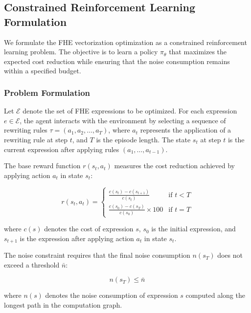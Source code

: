 \subsection{Constrained Reinforcement Learning Formulation}

We formulate the FHE vectorization optimization as a constrained reinforcement learning problem. The objective is to learn a policy $\pi_\theta$ that maximizes the expected cost reduction while ensuring that the noise consumption remains within a specified budget.

\subsubsection{Problem Formulation}

Let $\mathcal{E}$ denote the set of FHE expressions to be optimized. For each expression $e \in \mathcal{E}$, the agent interacts with the environment by selecting a sequence of rewriting rules $\tau = (a_1, a_2, \ldots, a_T)$, where $a_t$ represents the application of a rewriting rule at step $t$, and $T$ is the episode length. The state $s_t$ at step $t$ is the current expression after applying rules $(a_1, \ldots, a_{t-1})$.

The base reward function $r(s_t, a_t)$ measures the cost reduction achieved by applying action $a_t$ in state $s_t$:

\begin{equation}
r(s_t, a_t) = \begin{cases}
\frac{c(s_t) - c(s_{t+1})}{c(s_t)} & \text{if } t < T \\
\frac{c(s_0) - c(s_T)}{c(s_0)} \times 100 & \text{if } t = T
\end{cases}
\label{eq:base-reward}
\tag{7}
\end{equation}

where $c(s)$ denotes the cost of expression $s$, $s_0$ is the initial expression, and $s_{t+1}$ is the expression after applying action $a_t$ in state $s_t$.

The noise constraint requires that the final noise consumption $n(s_T)$ does not exceed a threshold $\bar{n}$:

\begin{equation}
n(s_T) \leq \bar{n}
\label{eq:noise-constraint}
\tag{8}
\end{equation}

where $n(s)$ denotes the noise consumption of expression $s$ computed along the longest path in the computation graph.

